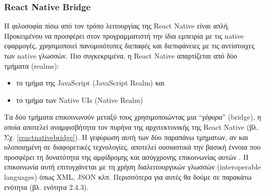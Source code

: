 \subsubsection{React Native Bridge}

Η φιλοσοφία πίσω από τον τρόπο λειτουργίας της React Native είναι απλή. Προκειμένου να προσφέρει στον προγραμματιστή την ίδια εμπειρία με τις native εφαρμογές, χρησιμοποιεί πανομοιότυπες διεπαφές και διεπιφάνειες με τις αντίστοιχες των native γλωσσών. Πιο συγκεκριμένα, η React Native απαρτίζεται από δύο τμήματα (realms): 

\begin{itemize}
    \item το τμήμα της JavaScript (JavaScript Realm) και
    \item το τμήμα των Native UIs (Native Realm)
\end{itemize} 

Τα δύο τμήματα επικοινωνούν μεταξύ τους χρησιμοποιώντας μια ``\textit{γέφυρα}'' (bridge), η οποία αποτελεί αναμφισβήτητα τον πυρήνα της αρχιτεκτονικής της React Native (βλ. Σχ. \ref{reactnativebridge}). Η γεφύρωση αυτή των δύο παραπάνω τμηματων, αν και υλοποιημένη σε διαφορετικές τεχνολογίες, αποτελεί ουσιαστικά την βασική έννοια που προσφέρει τη δυνατότητα της αμφίδρομης και ασύγχρονης επικοινωνίας αυτών \cite{[RN4]}. Η επικοινωνία αυτή επιτυγχάνεται με τη χρήση διαλειτουργικών γλωσσών (interoperable languages) όπως XML, JSON κλπ. Περισσότερα για αυτές θα δούμε σε παρακάτω ενότητα (βλ. ενότητα 2.4.3).

